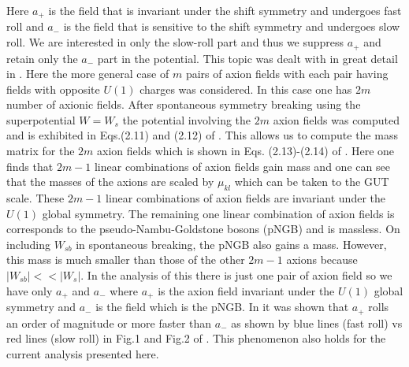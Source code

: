 \documentclass[a4paper,11pt]{article}
\begin{document}
  Here $a_+$ is the field that  is invariant under the shift symmetry and  undergoes fast roll and $a_-$ is the field that is sensitive to the shift symmetry and undergoes slow roll. We are interested in only the slow-roll part
  and thus we suppress $a_+$ and retain only the $a_-$ part in the potential. 
  This topic was dealt with in great detail in \cite{Nath:2017ihp}. Here the more general case of $m$ pairs of axion fields
  with each pair having fields with opposite $U(1)$ charges was considered.  In this case one has $2m$ number of axionic fields.
  After spontaneous symmetry breaking using the superpotential $W=W_s$ the potential involving the $2m$ axion 
  fields was computed and is exhibited in Eqs.(2.11) and (2.12) of  \cite{Nath:2017ihp}.  This allows us to compute the 
  mass matrix for the $2m$ axion fields which is shown in Eqs. (2.13)-(2.14) of  \cite{Nath:2017ihp}. Here one finds that $2m-1$ 
  linear combinations of   axion fields gain mass and one can see that the masses of the axions are scaled by $\mu_{kl}$ which can be taken to the 
  GUT scale. These $2m-1$ linear combinations of axion fields are invariant under the $U(1)$ global symmetry. The remaining one 
  linear combination of axion fields is corresponds to the pseudo-Nambu-Goldstone bosons (pNGB)  and is massless. On including $W_{sb}$ in
   spontaneous breaking, the pNGB also gains a mass. However, this mass is much smaller than those of the other $2m-1$ axions 
   because $|W_{sb}| << |W_s|$. In the analysis of this there is just one pair of axion field so we have only $a_+$ and $a_-$ 
   where $a_+$ is the axion field invariant under the $U(1)$ global symmetry and $a_-$ is the field which is the pNGB.  
   In  \cite{Nath:2017ihp} it was shown that   $a_+$ rolls an order of magnitude or more  faster than $a_-$ as shown by blue lines (fast roll) vs red lines (slow roll) in Fig.1 and Fig.2 of  \cite{Nath:2017ihp}.  This phenomenon also holds for the current analysis presented here.
  
\end{document}
